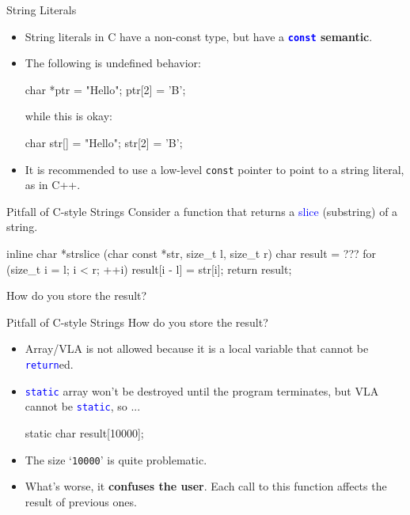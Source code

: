 \documentclass{beamer}
\newcommand{\blue}[1]{\textcolor{blue}{#1}}
\newcommand{\ttt}[1]{\texttt{#1}}
\newcommand{\bluett}[1]{\blue{\ttt{#1}}}
\theoremstyle{definition}
\begin{document}
\begin{frame}[fragile]{String Literals}
    \begin{itemize}
        \item String literals in C have a non-const type, but have a \textbf{\bluett{const} semantic}.
        \item The following is undefined behavior:
        \begin{cpp}
char *ptr = "Hello";
ptr[2] = 'B';
        \end{cpp}
        while this is okay:
        \begin{cpp}
char str[] = "Hello";
str[2] = 'B';
        \end{cpp}
        \pause
        \item It is recommended to use a low-level \ttt{const} pointer to point to a string literal, as in C++.
    \end{itemize}
\end{frame}

\begin{frame}[fragile]{Pitfall of C-style Strings}
    Consider a function that returns a \blue{slice} (substring) of a string.
    \begin{cpp}
inline char *strslice
    (char const *str, size_t l, size_t r) {
  char result = ???
  for (size_t i = l; i < r; ++i)
    result[i - l] = str[i];
  return result;
}
    \end{cpp}
    How do you store the result?
\end{frame}

\begin{frame}[fragile]{Pitfall of C-style Strings}
    How do you store the result?
    \begin{itemize}
        \pause
        \item Array/VLA is not allowed because it is a local variable that cannot be \bluett{return}ed.
        \pause
        \item \bluett{static} array won't be destroyed until the program terminates, but VLA cannot be \bluett{static}, so ...
        \begin{cpp}
static char result[10000];
        \end{cpp}
        \item The size `\ttt{10000}' is quite problematic.
        \pause
        \item What's worse, it \textbf{confuses the user}. Each call to this function affects the result of previous ones.
    \end{itemize}
\end{frame}
\end{document}
